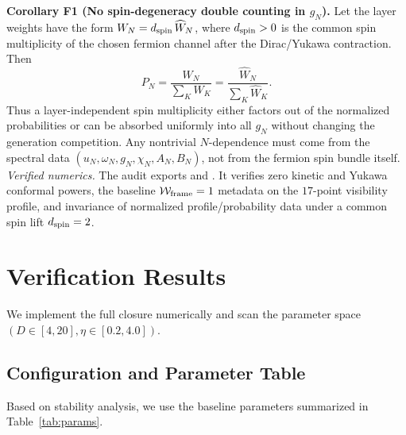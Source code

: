\documentclass[aps,prd,onecolumn,notitlepage,nofootinbib,superscriptaddress,11pt,floatfix]{revtex4-2}
\begin{document}
\medskip\noindent\textbf{Corollary F1 (No spin-degeneracy double counting in \(g_N\)).}
Let the layer weights have the form \(W_N=d_{\rm spin}\,\widehat W_N\), where \(d_{\rm spin}>0\) is the common spin multiplicity of the chosen fermion channel after the Dirac/Yukawa contraction.  Then
\[
P_N=\frac{W_N}{\sum_K W_K}
=\frac{\widehat W_N}{\sum_K\widehat W_K}.
\]
Thus a layer-independent spin multiplicity either factors out of the normalized probabilities or can be absorbed uniformly into all \(g_N\) without changing the generation competition.  Any nontrivial \(N\)-dependence must come from the spectral data \((u_N,\omega_N,g_N,\chi_N,A_N,B_N)\), not from the fermion spin bundle itself.
\emph{Verified numerics.} The audit  exports  and .  It verifies zero kinetic and Yukawa conformal powers, the baseline \(\mathcal W_{\rm frame}=1\) metadata on the \(17\)-point visibility profile, and invariance of normalized profile/probability data under a common spin lift \(d_{\rm spin}=2\).

\section{Verification Results}
\label{sec:results}

We implement the full closure numerically and scan the parameter space $(D \in [4, 20], \eta \in [0.2, 4.0])$.

\subsection{Configuration and Parameter Table}
Based on stability analysis, we use the baseline parameters summarized in Table~\ref{tab:params}.
\end{document}
